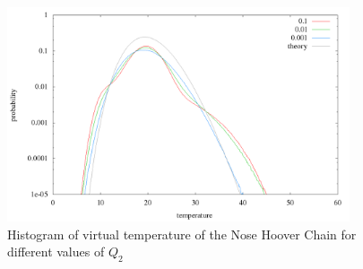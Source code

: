 \begin{figure}[H]
\centering
\includegraphics[width=0.9\textwidth]{./graphics/Histogramm_tempCol_one_Chain.png}
\caption{Histogram of virtual temperature of the Nose Hoover Chain for different values of $Q_2$ }
\label{im:temp_chain}
\end{figure}




